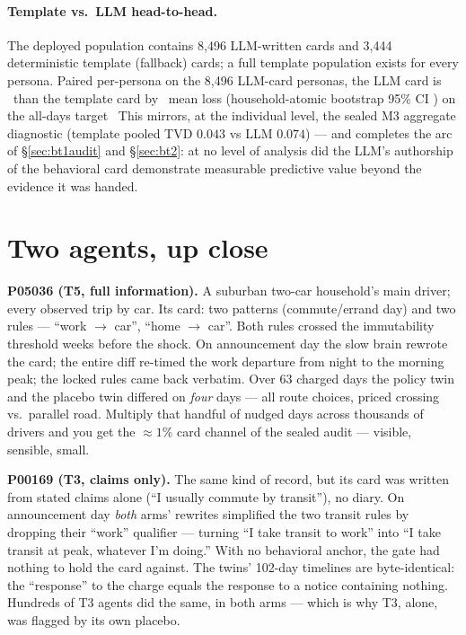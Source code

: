 \documentclass[11pt]{article}
\begin{document}
\paragraph{Template vs.\ LLM head-to-head.} The deployed population
contains 8{,}496 LLM-written cards and 3{,}444 deterministic template
(fallback) cards; a full template population exists for every persona.
Paired per-persona on the 8{,}496 LLM-card personas, the LLM card is
\essHtoHDirection\ than the template card by \essHtoHDelta\ mean loss
(household-atomic bootstrap 95\% CI \essHtoHCI) on the all-days target
\essHtoHHoldSentence\ This mirrors, at the individual level, the sealed
M3 aggregate diagnostic (template pooled TVD $0.043$ vs LLM $0.074$)
--- and completes the arc of \S\ref{sec:bt1audit} and \S\ref{sec:bt2}:
at no level of analysis did the LLM's authorship of the behavioral card
demonstrate measurable predictive value beyond the evidence it was
handed.

\section{Two agents, up close}
\label{sec:walkthrough}

\begin{tcolorbox}[colback=gray!4,colframe=black!40,title={\textbf{Boxed
case study: one honest adapter, one churner} (both real, from the
sealed BT1 inspector export; masked vocabulary verbatim)},fonttitle=\small\bfseries,left=1mm,right=1mm]
\small
\textbf{P05036 (T5, full information).} A suburban two-car household's
main driver; every observed trip by car. Its card: two patterns
(commute/errand day) and two rules --- ``work $\to$ car'', ``home $\to$
car''. Both rules crossed the immutability threshold weeks before the
shock. On announcement day the slow brain rewrote the card; the entire
diff re-timed the work departure from night to the morning peak; the
locked rules came back verbatim. Over 63 charged days the policy twin
and the placebo twin differed on \emph{four} days --- all route
choices, priced crossing vs.\ parallel road. Multiply that handful of
nudged days across thousands of drivers and you get the $\approx 1\%$
card channel of the sealed audit --- visible, sensible, small.

\medskip
\textbf{P00169 (T3, claims only).} The same kind of record, but its
card was written from stated claims alone (``I usually commute by
transit''), no diary. On announcement day \emph{both} arms' rewrites
simplified the two transit rules by dropping their ``work'' qualifier
--- turning ``I take transit to work'' into ``I take transit at peak,
whatever I'm doing.'' With no behavioral anchor, the gate had nothing
to hold the card against. The twins' 102-day timelines are
byte-identical: the ``response'' to the charge equals the response to
a notice containing nothing. Hundreds of T3 agents did the same, in
both arms --- which is why T3, alone, was flagged by its own placebo.
\end{tcolorbox}
\end{document}
